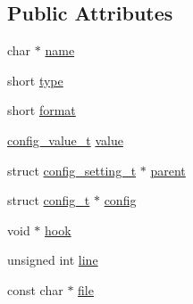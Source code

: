 \subsection*{Public Attributes}
\begin{DoxyCompactItemize}
\item 
char $\ast$ \hyperlink{structconfig__setting__t_a2228af4451498a4961b72dd4dcfe57cb}{name}
\item 
short \hyperlink{structconfig__setting__t_aab8065083de2436448b7b99b46feff18}{type}
\item 
short \hyperlink{structconfig__setting__t_a8957b2dcbf59fcfd00a3abe41bd0d7b5}{format}
\item 
\hyperlink{unionconfig__value__t}{config\-\_\-value\-\_\-t} \hyperlink{structconfig__setting__t_a2d217386c7e30456e484151b61ce597f}{value}
\item 
struct \hyperlink{structconfig__setting__t}{config\-\_\-setting\-\_\-t} $\ast$ \hyperlink{structconfig__setting__t_a70368ebbbb3c902adbbcd96606547d7d}{parent}
\item 
struct \hyperlink{structconfig__t}{config\-\_\-t} $\ast$ \hyperlink{structconfig__setting__t_a8d6d8450cc6e3485d9f2da3302c231f4}{config}
\item 
void $\ast$ \hyperlink{structconfig__setting__t_aa8238d7d2cc16b51eac47e82867494a5}{hook}
\item 
unsigned int \hyperlink{structconfig__setting__t_a11fc7f855c8200ea53458451d0ef0e9c}{line}
\item 
const char $\ast$ \hyperlink{structconfig__setting__t_af28d89c366212409e49f5dd52c9b7240}{file}
\end{DoxyCompactItemize}


